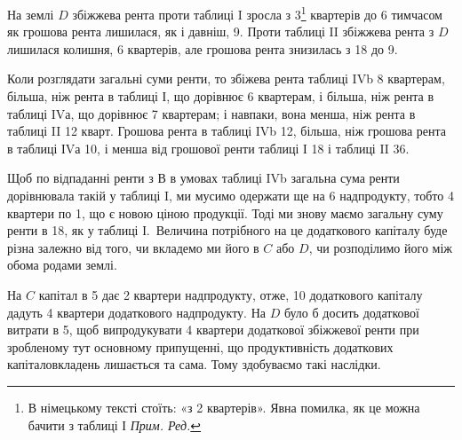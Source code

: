 
На землі $D$ збіжжева рента проти таблиці I зросла з 3\footnote*{
В німецькому тексті стоїть: «з 2 квартерів». Явна помилка, як це можна бачити з таблиці І \emph{Прим. Ред.}
} квартерів до 6
тимчасом як грошова рента лишилася, як і давніш, 9. Проти таблиці II
збіжжева рента з $D$ лишилася колишня, 6 квартерів, але грошова рента знизилась
з 18 до 9.

Коли розглядати загальні суми ренти, то збіжева рента таблиці IVb \deq{} 8
квартерам, більша, ніж рента в таблиці І, що дорівнює 6 квартерам, і більша,
ніж рента в таблиці IVа, що дорівнює 7 квартерам; і навпаки, вона менша, ніж
рента в таблиці II \deq{} 12 кварт. Грошова рента в таблиці IVb \deq{} 12,
більша, ніж грошова рента в таблиці ІVа \deq{} 10, і менша від грошової
ренти таблиці І \deq{} 18 і таблиці II \deq{} 36.

Щоб по відпаданні ренти з $В$ в умовах таблиці IVb загальна сума ренти
дорівнювала такій у таблиці I, ми мусимо одержати ще на 6
надпродукту, тобто 4 квартери по 1, що є новою ціною продукції.
Тоді ми знову маємо загальну суму ренти в 18, як у таблиці І.~Величина
потрібного на це додаткового капіталу буде різна залежно від того, чи
вкладемо ми його в $C$ або $D$, чи розподілимо його між обома родами землі.

На $C$ капітал в 5 дає 2 квартери надпродукту, отже, 10
додаткового капіталу дадуть 4 квартери додаткового надпродукту. На $D$ було б
досить додаткової витрати в 5, щоб випродукувати 4 квартери додаткової
збіжжевої ренти при зробленому тут основному припущенні, що продуктивність
додаткових капіталовкладень лишається та сама. Тому здобуваємо
такі наслідки.

